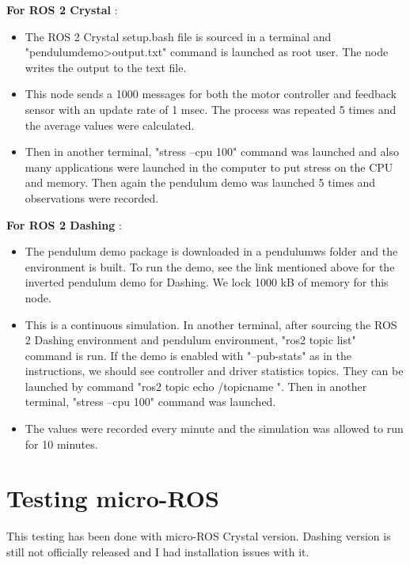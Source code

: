 \documentclass[%
xelatex,
	oneside,		%
	12pt,			%
	parskip=half,	%
	abstracton,
	chapterprefix=true%
    appendixprefix=true]
{scrbook}
\begin{document}
{\bfseries For ROS 2 Crystal} :
\begin{itemize}
\item The ROS 2 Crystal setup.bash file is sourced in a terminal and "pendulum\textunderscore demo>output.txt" command is launched as root user. The node writes the output to the text file.
\item This node sends a 1000 messages for both the motor controller and feedback sensor with an update rate of 1 msec. The process was repeated 5 times and the average values were calculated.
\item Then in another terminal, "stress --cpu 100" command was launched and also many applications were launched in the computer to put stress on the CPU and memory. Then again the pendulum demo was launched 5 times and observations were recorded.
\end{itemize}
{\bfseries For ROS 2 Dashing} :
\begin{itemize}
\item The pendulum demo package is downloaded in a pendulum\textunderscore ws folder and the environment is built. To run the demo, see the link mentioned above for the inverted pendulum demo for Dashing. We lock 1000 kB of memory for this node.
\item This is a continuous simulation. In another terminal, after sourcing the ROS 2 Dashing environment and pendulum environment, "ros2 topic list" command is run. If the demo is enabled with "--pub-stats" as in the instructions, we should see controller and driver statistics topics. They can be launched by command "ros2 topic echo /topic\textunderscore name ". Then in another terminal, "stress --cpu 100" command was launched.
\item The values were recorded every minute and the simulation was allowed to run for 10 minutes.
\end{itemize}
\section{Testing micro-ROS}
\vspace*{0.5cm}
This testing has been done with micro-ROS Crystal version. Dashing version is still not officially released and I had installation issues with it.
\end{document}
